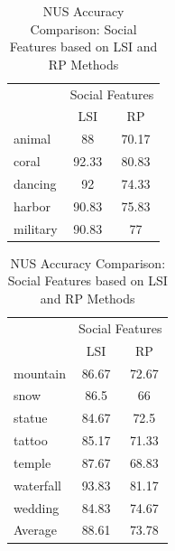 \begin{table}[!ht]
\caption{ NUS Accuracy Comparison: Social Features based on LSI and RP Methods} %
\centering
\begin{tabular}{|p{1.7cm}|c|c|}
 \hline
{\multirow{2}{*}{Labels}} & \multicolumn{2}{|c|}{Social Features} \\
\cline{2-3}
 & LSI & RP \\  [1ex] \hline
animal & 88 & 70.17 \\  [1ex] \hline
coral & 92.33 & 80.83 \\  [1ex] \hline
dancing & 92 & 74.33 \\  [1ex] \hline
harbor & 90.83 & 75.83 \\  [1ex] \hline
military & 90.83 & 77 \\  [1ex] \hline
\end{tabular}
 \hspace{1em}\vspace*{0.5cm}
 \begin{tabular}{|p{1.7cm}|c|c|}
  \hline
{\multirow{2}{*}{Labels}} & \multicolumn{2}{|c|}{Social Features} \\ \cline{2-3}
 & LSI & RP \\ \hline
mountain & 86.67 & 72.67 \\  [1ex] \hline
snow & 86.5 & 66 \\  [1ex] \hline
statue & 84.67 & 72.5 \\  [1ex] \hline
tattoo & 85.17 & 71.33 \\  [1ex] \hline
temple & 87.67 & 68.83 \\  [1ex] \hline
waterfall & 93.83 & 81.17 \\  [1ex] \hline
wedding & 84.83 & 74.67 \\  [1ex] \hline
Average & 88.61 & 73.78 \\  [1ex] \hline
\end{tabular}
 \label{NUSAccuracySocialFeatures} %
\end{table}

